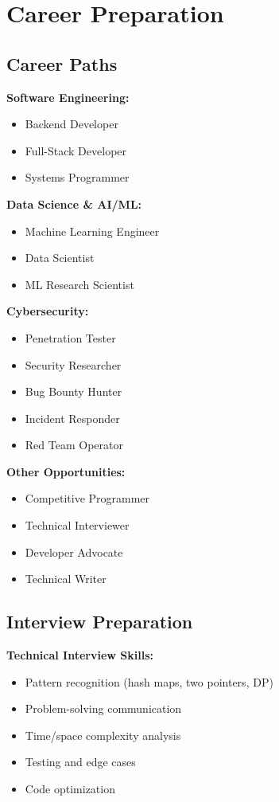 \documentclass[11pt,letterpaper]{article}
\begin{document}
\section{Career Preparation}

\subsection{Career Paths}
\textbf{Software Engineering:}
\begin{itemize}[leftmargin=*]
    \item Backend Developer
    \item Full-Stack Developer
    \item Systems Programmer
\end{itemize}

\textbf{Data Science \& AI/ML:}
\begin{itemize}[leftmargin=*]
    \item Machine Learning Engineer
    \item Data Scientist
    \item ML Research Scientist
\end{itemize}

\textbf{Cybersecurity:}
\begin{itemize}[leftmargin=*]
    \item Penetration Tester
    \item Security Researcher
    \item Bug Bounty Hunter
    \item Incident Responder
    \item Red Team Operator
\end{itemize}

\textbf{Other Opportunities:}
\begin{itemize}[leftmargin=*]
    \item Competitive Programmer
    \item Technical Interviewer
    \item Developer Advocate
    \item Technical Writer
\end{itemize}

\subsection{Interview Preparation}
\textbf{Technical Interview Skills:}
\begin{itemize}[leftmargin=*]
    \item Pattern recognition (hash maps, two pointers, DP)
    \item Problem-solving communication
    \item Time/space complexity analysis
    \item Testing and edge cases
    \item Code optimization
\end{itemize}
\end{document}

